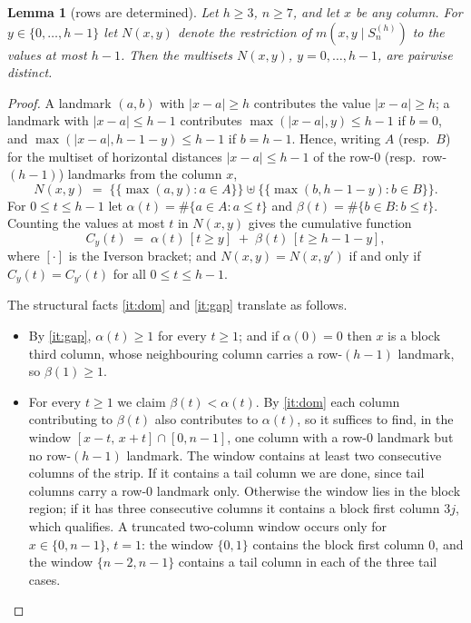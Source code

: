 \documentclass[11pt]{amsart}
\newtheorem{lemma}[lemma]{Lemma}
\theoremstyle{remark}
\newcommand{\ms}[1]{\mathopen{\{\!\{}#1\mathclose{\}\!\}}}
\begin{document}
\begin{lemma}[rows are determined]\label{lem:V}
Let $h\ge 3$, $n\ge 7$, and let $x$ be any column.  For $y\in\{0,\dots,h-1\}$ let $N(x,y)$ denote the restriction of $m(x,y\mid S^{(h)}_n)$ to the values at most $h-1$.  Then the multisets $N(x,y)$, $y=0,\dots,h-1$, are pairwise distinct.
\end{lemma}

\begin{proof}
A landmark $(a,b)$ with $|x-a|\ge h$ contributes the value $|x-a|\ge h$; a landmark with $|x-a|\le h-1$ contributes $\max(|x-a|,y)\le h-1$ if $b=0$, and $\max(|x-a|,h-1-y)\le h-1$ if $b=h-1$.  Hence, writing $A$ (resp.\ $B$) for the multiset of horizontal distances $|x-a|\le h-1$ of the row-$0$ (resp.\ row-$(h-1)$) landmarks from the column $x$,
\[
 N(x,y)\;=\;\ms{\max(a,y):a\in A}\uplus\ms{\max(b,h-1-y):b\in B}.
\]
For $0\le t\le h-1$ let $\alpha(t)=\#\{a\in A:a\le t\}$ and $\beta(t)=\#\{b\in B:b\le t\}$.  Counting the values at most $t$ in $N(x,y)$ gives the cumulative function
\begin{equation}\label{eq:cum}
 C_y(t)\;=\;\alpha(t)\,[t\ge y]\;+\;\beta(t)\,[t\ge h-1-y],
\end{equation}
where $[\cdot]$ is the Iverson bracket; and $N(x,y)=N(x,y')$ if and only if $C_y(t)=C_{y'}(t)$ for all $0\le t\le h-1$.

The structural facts \ref{it:dom} and \ref{it:gap} translate as follows.
\begin{itemize}[leftmargin=2em]
\item By \ref{it:gap}, $\alpha(t)\ge 1$ for every $t\ge 1$; and if $\alpha(0)=0$ then $x$ is a block third column, whose neighbouring column carries a row-$(h-1)$ landmark, so $\beta(1)\ge 1$.
\item For every $t\ge 1$ we claim $\beta(t)<\alpha(t)$.  By \ref{it:dom} each column contributing to $\beta(t)$ also contributes to $\alpha(t)$, so it suffices to find, in the window $[x-t,\,x+t]\cap[0,n-1]$, one column with a row-$0$ landmark but no row-$(h-1)$ landmark.  The window contains at least two consecutive columns of the strip.  If it contains a tail column we are done, since tail columns carry a row-$0$ landmark only.  Otherwise the window lies in the block region; if it has three consecutive columns it contains a block first column $3j$, which qualifies.  A truncated two-column window occurs only for $x\in\{0,n-1\}$, $t=1$: the window $\{0,1\}$ contains the block first column $0$, and the window $\{n-2,n-1\}$ contains a tail column in each of the three tail cases.
\end{itemize}


\end{proof}
\end{document}
